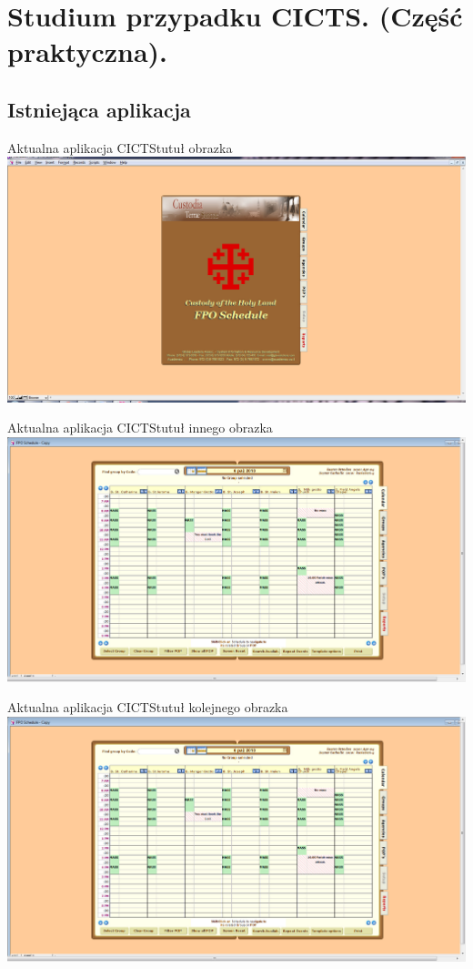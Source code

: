 \section[Studium przypadku CICTS]{Studium przypadku CICTS. (Część praktyczna).}

\subsection{Istniejąca aplikacja}

\begin{frame}{Aktualna aplikacja CICTS}{tutuł obrazka}
   \includegraphics[width=.6\linewidth]{FPOSchedule1.jpg}
\end{frame}

\begin{frame}{Aktualna aplikacja CICTS}{tutuł innego obrazka}
   \includegraphics[width=.6\linewidth]{FPOSchedule2.jpg}
\end{frame}

\begin{frame}{Aktualna aplikacja CICTS}{tutuł kolejnego obrazka}
   \includegraphics[width=.6\linewidth]{FPOSchedule2.jpg}
\end{frame}

